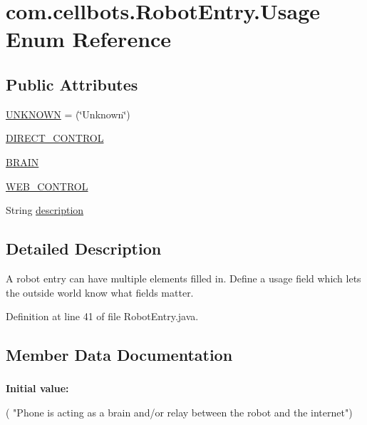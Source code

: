 \hypertarget{enumcom_1_1cellbots_1_1_robot_entry_1_1_usage}{\section{com.\-cellbots.\-Robot\-Entry.\-Usage Enum Reference}
\label{enumcom_1_1cellbots_1_1_robot_entry_1_1_usage}
}
\subsection*{Public Attributes}
\begin{DoxyCompactItemize}
\item 
\hyperlink{enumcom_1_1cellbots_1_1_robot_entry_1_1_usage_a5169a7aa31ca1e98ab1e5c0734800913}{U\-N\-K\-N\-O\-W\-N} = (\char`\"{}Unknown\char`\"{})
\item 
\hyperlink{enumcom_1_1cellbots_1_1_robot_entry_1_1_usage_acde3e55767e5ccde3d05956d4cd77a9b}{D\-I\-R\-E\-C\-T\-\_\-\-C\-O\-N\-T\-R\-O\-L}
\item 
\hyperlink{enumcom_1_1cellbots_1_1_robot_entry_1_1_usage_a505953bd63076b7804654d9be3467c3c}{B\-R\-A\-I\-N}
\item 
\hyperlink{enumcom_1_1cellbots_1_1_robot_entry_1_1_usage_ac658e6af9e7d6189350cfa1c9b95c6db}{W\-E\-B\-\_\-\-C\-O\-N\-T\-R\-O\-L}
\item 
String \hyperlink{enumcom_1_1cellbots_1_1_robot_entry_1_1_usage_abe9ff9b3b32f032dc92cab37428c0a83}{description}
\end{DoxyCompactItemize}


\subsection{Detailed Description}
A robot entry can have multiple elements filled in. Define a usage field which lets the outside world know what fields matter. 

Definition at line 41 of file Robot\-Entry.\-java.



\subsection{Member Data Documentation}
\hypertarget{enumcom_1_1cellbots_1_1_robot_entry_1_1_usage_a505953bd63076b7804654d9be3467c3c}{
\subsubsection[{B\-R\-A\-I\-N}]{}}\label{enumcom_1_1cellbots_1_1_robot_entry_1_1_usage_a505953bd63076b7804654d9be3467c3c}
{\bfseries Initial value\-:}
\begin{DoxyCode}
(
                                "Phone is acting as a brain and/or relay
       between the robot and the internet")
\end{DoxyCode}


